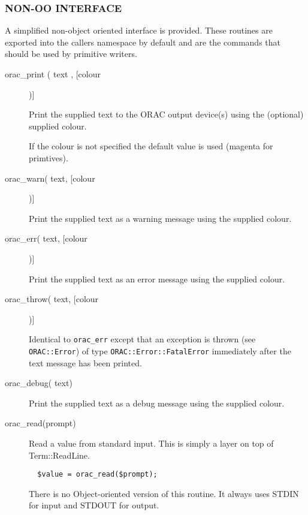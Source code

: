 \subsubsection*{NON-OO INTERFACE\label{ORAC::Print_NON-OO_INTERFACE}}


A simplified non-object oriented interface is provided.
These routines are exported into the callers namespace by default
and are the commands that should be used by primitive writers.

\begin{description}

\item[orac\_print ( text , [colour])] \mbox{}

Print the supplied text to the ORAC output device(s)
using the (optional) supplied colour.



If the colour is not specified the default value is used (magenta
for primtives).


\item[orac\_warn( text, [colour])] \mbox{}

Print the supplied text as a warning message using the supplied
colour.


\item[orac\_err( text, [colour])] \mbox{}

Print the supplied text as an error message using the supplied
colour.


\item[orac\_throw( text, [colour])] \mbox{}

Identical to \texttt{orac\_err} except that an exception is thrown (see
\texttt{ORAC::Error}) of type \texttt{ORAC::Error::FatalError} immediately after
the text message has been printed.


\item[orac\_debug( text)] \mbox{}

Print the supplied text as a debug message using the supplied
colour.


\item[orac\_read(prompt)] \mbox{}

Read a value from standard input. This is simply a layer
on top of Term::ReadLine.

\begin{verbatim}
  $value = orac_read($prompt);
\end{verbatim}


There is no Object-oriented version of this routine. It always
uses STDIN for input and STDOUT for output.

\end{description}
